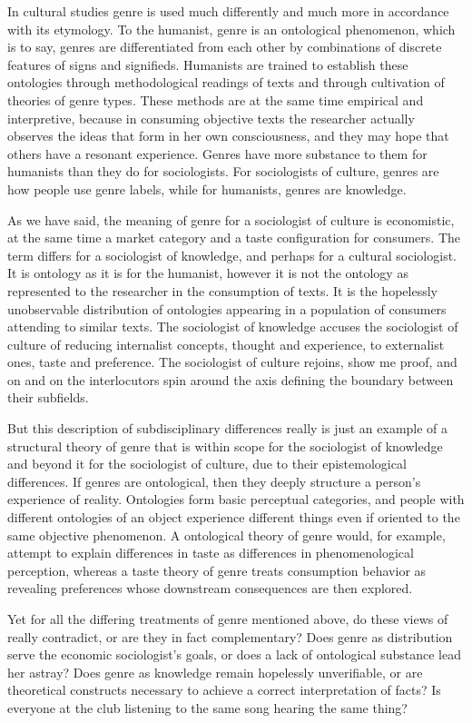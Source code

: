\documentclass[]{book}
\theoremstyle{definition}
\theoremstyle{definition}
\theoremstyle{definition}
\theoremstyle{remark}
\begin{document}
In cultural studies genre is used much differently and much more in
accordance with its etymology. To the humanist, genre is an ontological
phenomenon, which is to say, genres are differentiated from each other
by combinations of discrete features of signs and signifieds. Humanists
are trained to establish these ontologies through methodological
readings of texts and through cultivation of theories of genre types.
These methods are at the same time empirical and interpretive, because
in consuming objective texts the researcher actually observes the ideas
that form in her own consciousness, and they may hope that others have a
resonant experience. Genres have more substance to them for humanists
than they do for sociologists. For sociologists of culture, genres are
how people use genre labels, while for humanists, genres are knowledge.

As we have said, the meaning of genre for a sociologist of culture is
economistic, at the same time a market category and a taste
configuration for consumers. The term differs for a sociologist of
knowledge, and perhaps for a cultural sociologist. It is ontology as it
is for the humanist, however it is not the ontology as represented to
the researcher in the consumption of texts. It is the hopelessly
unobservable distribution of ontologies appearing in a population of
consumers attending to similar texts. The sociologist of knowledge
accuses the sociologist of culture of reducing internalist concepts,
thought and experience, to externalist ones, taste and preference. The
sociologist of culture rejoins, show me proof, and on and on the
interlocutors spin around the axis defining the boundary between their
subfields.

But this description of subdisciplinary differences really is just an
example of a structural theory of genre that is within scope for the
sociologist of knowledge and beyond it for the sociologist of culture,
due to their epistemological differences. If genres are ontological,
then they deeply structure a person's experience of reality. Ontologies
form basic perceptual categories, and people with different ontologies
of an object experience different things even if oriented to the same
objective phenomenon. A ontological theory of genre would, for example,
attempt to explain differences in taste as differences in
phenomenological perception, whereas a taste theory of genre treats
consumption behavior as revealing preferences whose downstream
consequences are then explored.

Yet for all the differing treatments of genre mentioned above, do these
views of really contradict, or are they in fact complementary? Does
genre as distribution serve the economic sociologist's goals, or does a
lack of ontological substance lead her astray? Does genre as knowledge
remain hopelessly unverifiable, or are theoretical constructs necessary
to achieve a correct interpretation of facts? Is everyone at the club
listening to the same song hearing the same thing?
\end{document}
